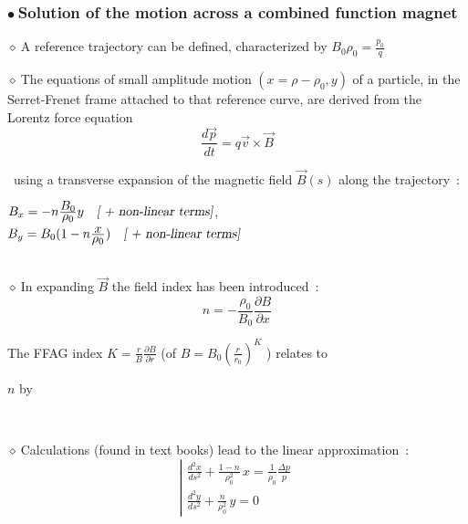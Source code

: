 \documentclass[12pt]{article}
\newcommand{\nib}{\noindent \ensuremath{\bullet~}}
\newcommand{\nid}{\noindent \ensuremath{\diamond~}}
\newcommand{\nin}{\noindent~}
\newcommand{\blue}{\color{blue}}
\begin{document}
{\fontsize{17}{25} \selectfont

\subsubsection*{\LARGE \nib Solution of the motion across a combined function magnet \label{slideODE}}


\nid A reference trajectory can be defined, characterized by $B_0 \rho_0 = \frac{ \textstyle{p_0}}{\textstyle{q}}$ 

\nid The equations of small amplitude motion $(x = \rho - \rho_0, y)$ of a particle,  in the Serret-Frenet frame 
attached to that reference curve, are  derived from the Lorentz force equation 
$$ \frac{ \textstyle{d\vec p}}{\textstyle{d t}} = q \vec v \times \vec B$$

\nin using a  transverse expansion of the magnetic field $\vec B(s)$ along the trajectory~: 

$B_x = -n \frac{\textstyle{B_0}}{\textstyle{\rho_0}} y  ~ ~ \textsl{ [ + non-linear terms]}$, ~ ~ ~
$B_y = B_0 (1-n \frac{\textstyle{x}}{\textstyle{\rho_0}} )   ~ ~ \textsl{  [ + non-linear terms]}$ \\
\\
\begin{minipage}[b]{.6\linewidth}

\nid In expanding $\vec B$  the field index has been  introduced~:
$$n = -\frac{\textstyle{\rho_0}}{\textstyle{B_0}}   \frac{\textstyle{\partial B}}{\textstyle{\partial x}}  $$

The FFAG index $K=\frac{\textstyle{r}}{\textstyle{B}}   \frac{\textstyle{\partial B}}{\textstyle{\partial r}}$  {(of  $B = B_0 (\frac{r}{r_0})^K$ )} relates to 

$n$ by 



~

\nid Calculations (found in text books) lead to the linear approximation~: \\[-2ex]
{\blue \LARGE 
$$ \left| 
\begin{array}{lr} 
\frac{\textstyle{d^2x}}{\textstyle{ds^2}} + \frac{\textstyle{1 - n}}{\textstyle{\rho_0^2}}  \, x =   
\frac{\textstyle{1}}{\textstyle{\rho_0}} \frac{\textstyle{\Delta p}}{\textstyle{p}} \\
\frac{\textstyle{d^2y}}{\textstyle{ds^2}} + \frac{\textstyle{ n}}{\textstyle{\rho_0^2}}  \, y =   0
\end{array} 
\right. $$
}


\end{minipage}}
\end{document}
